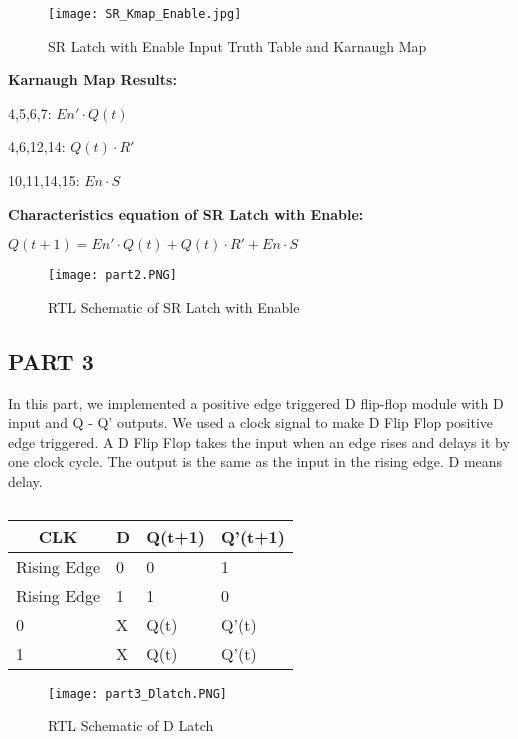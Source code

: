 \documentclass[pdftex,12pt,a4paper]{article}
\begin{document}
\begin{figure}[ht]
	\centering
	\texttt{[image: SR\_Kmap\_Enable.jpg]}	
	\caption{SR Latch with Enable Input Truth Table and Karnaugh Map}
	\label{fig3}
\end{figure}

\textbf{Karnaugh Map Results:}

4,5,6,7: \(En' \cdot Q(t)\)

4,6,12,14: \(Q(t) \cdot R'\)

10,11,14,15: \(En \cdot S\)

\textbf{Characteristics equation of SR Latch with Enable:}

\(Q (t+1) = En' \cdot Q(t) + Q(t) \cdot R' + En \cdot S\)



\begin{figure}[ht]
	\centering
	\texttt{[image: part2.PNG]}	
	\caption{RTL Schematic of SR Latch with Enable}
	\label{fig4}
\end{figure}

\clearpage


\subsection{PART 3}
In this part, we implemented a positive edge triggered D flip-flop module with D input and Q - Q' outputs. We used a clock signal to make D Flip Flop positive edge triggered. A D Flip Flop takes the input when an edge rises and delays it by one clock cycle.  The output is the same as the input in the rising edge. D means delay.

\begin{table}[h!]
\begin{tabular}{|l|l|l|l|}
\hline
\multicolumn{1}{|c|}{CLK} & D & Q(t+1) & Q'(t+1) \\ \hline
Rising Edge               & 0 & 0      & 1       \\ \hline
Rising Edge               & 1 & 1      & 0       \\ \hline
0                         & X & Q(t)   & Q'(t)   \\ \hline
1                         & X & Q(t)   & Q'(t)   \\ \hline
\end{tabular}
\caption{\label{tab:table-name}}
\end{table}

\begin{figure}[ht]
	\centering
	\texttt{[image: part3\_Dlatch.PNG]}	
	\caption{RTL Schematic of D Latch}
	\label{fig5}
\end{figure}
\end{document}
